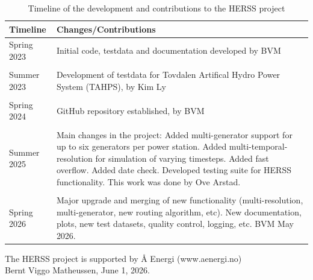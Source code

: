 \begin{table}[h]
	\centering
	\begin{tabular}{p{} p{}}
		\hline
		\textbf{Timeline} & \textbf{Changes/Contributions} \\
		\hline
		
		Spring 2023 &
		Initial code, testdata and documentation developed by BVM \\
		\\
		
		Summer 2023 &
		Development of testdata for Tovdalen Artifical Hydro Power System (TAHPS), by Kim Ly  \\
		\\
		
		
		Spring 2024 & GitHub repository established, by BVM \\
		\\
		
		Summer 2025 & 
		Main changes in the project: Added multi-generator support for up
		to six generators per power station. Added multi-temporal-
		resolution for simulation of varying timesteps. Added fast
		overflow. Added date check. Developed testing suite for HERSS
		functionality. This work was done by Ove Arstad. \\
		\\
		
		Spring 2026 & 
		Major upgrade and merging of new functionality (multi-resolution, multi-generator, new routing algorithm, etc). New documentation, plots, new test datasets, quality control, logging, etc. BVM May 2026. \\
		
		\hline
	\end{tabular}
	\caption{Timeline of the development and contributions to the HERSS project}
	\label{tab:history}
\end{table}

The HERSS project is supported by Å Energi (www.aenergi.no) \\

Bernt Viggo Matheussen, June 1, 2026.



